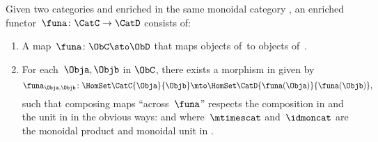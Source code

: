 \begin{ctdefinition}
    \label{def:enrichedfunctor}
    Given two categories \CatC and \CatD enriched in the same monoidal category \CatV, an enriched functor~$\funa\colon \CatC \to \CatD$ consists of:
    \begin{enumerate}
        \item A map~$\funa\colon \ObC \sto \ObD$ that maps objects of~\CatC to objects of~\CatD.
        \item For each~$\Obja, \Objb$ in $\ObC$, there exists a morphism in \CatV given by
              \begin{equation}
                  \funa_{\Obja, \Objb} \colon \HomSet\CatC{\Obja}{\Objb} \mto \HomSet\CatD{\funa(\Obja)}{\funa(\Objb)},
              \end{equation}
              such that composing maps ``across~$\funa$'' respects the composition in \CatC and the unit in \CatV in the obvious ways:
              and
              where~$\mtimescat$ and~$\idmoncat$ are the monoidal product and monoidal unit in \CatV.
    \end{enumerate}
\end{ctdefinition}


